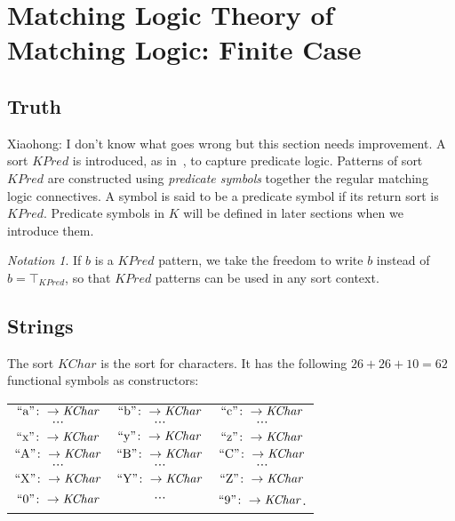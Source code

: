 \documentclass[UTF8,11pt]{article}
\newcounter{thmcounter}
\theoremstyle{plain}
\theoremstyle{definition}
\theoremstyle{remark}
\newtheorem{notation}[thmcounter]{Notation}
\newcommand{\KPred}{\mathit{KPred}}
\newcommand{\KChar}{\mathit{KChar}}
\newcommand{\quot}[1]{\mathrm{``#1"}}
\begin{document}
\section{Matching Logic Theory of Matching Logic: Finite Case}


\subsection{Truth}
\improvement
{Xiaohong: I don't know what goes wrong but this section needs improvement.}
A sort $\KPred$ is introduced, as in~\cite{rosu-2017-lmcs}, to capture predicate logic.
Patterns of sort $\KPred$ are constructed using \emph{predicate symbols} together the regular matching logic connectives.
A symbol is said to be a {predicate symbol} if its return sort is $\KPred$.
Predicate symbols in $K$ will be defined in later sections when we introduce them.

\begin{notation}
	If $b$ is a $\KPred$ pattern, we take the freedom to write $b$ instead of $b = \top_\KPred$, so that $\KPred$ patterns can be used in any sort context.
\end{notation}





\subsection{Strings}
The sort $\KChar$ is the sort for characters. It has the following $26 + 26 + 10 = 62$ functional symbols as constructors:
\begin{center}
	\begin{tabular}{c c c}
		$\quot{a} \colon \to \KChar$ & $\quot{b} \colon \to \KChar$ & $\quot{c} \colon \to \KChar$ \\
		$\cdots$ & $\cdots$ & $\cdots$ \\
		$\quot{x} \colon \to \KChar$ & $\quot{y} \colon \to \KChar$ & $\quot{z} \colon \to \KChar$ \\
		$\quot{A} \colon \to \KChar$ & $\quot{B} \colon \to \KChar$ & $\quot{C} \colon \to \KChar$ \\
		$\cdots$ & $\cdots$ & $\cdots$ \\
		$\quot{X} \colon \to \KChar$ & $\quot{Y} \colon \to \KChar$ & $\quot{Z} \colon \to \KChar$ \\
		$\quot{0} \colon \to \KChar$ & $\cdots$ & $\quot{9} \colon \to \KChar$. 
	\end{tabular}
\end{center}
\end{document}

